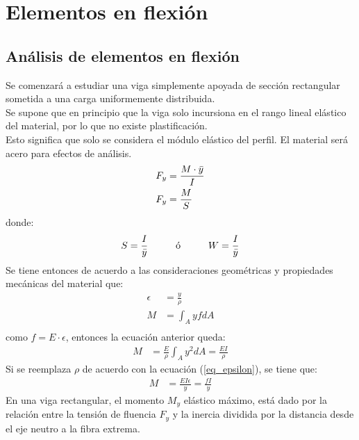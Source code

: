 %
%

\chapter{Elementos en flexión}
\section{Análisis de elementos en flexión}
Se comenzará a estudiar una viga simplemente apoyada de sección rectangular sometida a una carga uniformemente distribuida.\\
Se supone que en principio que la viga solo incursiona en el rango lineal elástico del material, por lo que no existe plastificación.\\
Esto significa que solo se considera el módulo elástico del perfil.
El material será acero para efectos de análisis.
\begin{align}
    F_y &= \frac{M\cdot \Bar{y}}{I}\\
    F_y &= \frac{M}{S}
\end{align}
donde:
\begin{align}
    S = \frac{I}{\Bar{y}} \hspace{10mm}\text{ó}\hspace{10mm} W = \frac{I}{\Bar{y}}
\end{align}
Se tiene entonces de acuerdo a las consideraciones geométricas y propiedades mecánicas del material que:\\
\begin{align} \label{eq_epsilon}
    \epsilon &= \frac{y}{\rho}\\
    M &= \int_A yfdA\\
\end{align}
como $f=E\cdot\epsilon$, entonces la ecuación anterior queda:\\
\begin{align}
    M &= \frac{E}{\rho}\int_A y^2dA=\frac{EI}{\rho}
\end{align}
Si se reemplaza $\rho$ de acuerdo con la ecuación (\ref{eq_epsilon}), se tiene que:\\
\begin{align}
    M &= \frac{EI\epsilon}{y} = \frac{fI}{y}
\end{align}
En una viga rectangular, el momento $M_y$ elástico máximo, está dado por la relación entre la tensión de fluencia $F_y$ y la inercia dividida por la distancia desde el eje neutro a la fibra extrema.\\
